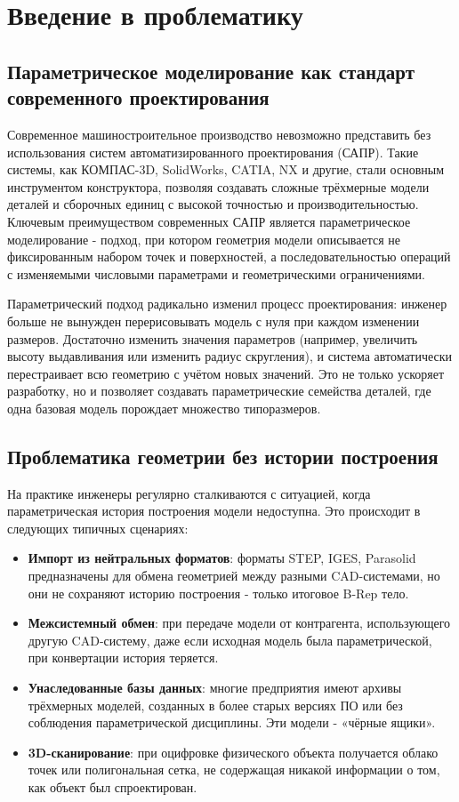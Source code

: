 
\section{Введение в проблематику}

\subsection{Параметрическое моделирование как стандарт современного проектирования}

Современное машиностроительное производство невозможно представить без использования систем автоматизированного проектирования (САПР). Такие системы, как КОМПАС-3D, SolidWorks, CATIA, NX и другие, стали основным инструментом конструктора, позволяя создавать сложные трёхмерные модели деталей и сборочных единиц с высокой точностью и производительностью. Ключевым преимуществом современных САПР является параметрическое моделирование - подход, при котором геометрия модели описывается не фиксированным набором точек и поверхностей, а последовательностью операций с изменяемыми числовыми параметрами и геометрическими ограничениями.

Параметрический подход радикально изменил процесс проектирования: инженер больше не вынужден перерисовывать модель с нуля при каждом изменении размеров. Достаточно изменить значения параметров (например, увеличить высоту выдавливания или изменить радиус скругления), и система автоматически перестраивает всю геометрию с учётом новых значений. Это не только ускоряет разработку, но и позволяет создавать параметрические семейства деталей, где одна базовая модель порождает множество типоразмеров.

\subsection{Проблематика геометрии без истории построения}

На практике инженеры регулярно сталкиваются с ситуацией, когда параметрическая история построения модели недоступна. Это происходит в следующих типичных сценариях:

\begin{itemize}
    \item \textbf{Импорт из нейтральных форматов}: форматы STEP, IGES, Parasolid предназначены для обмена геометрией между разными CAD-системами, но они не сохраняют историю построения - только итоговое B-Rep тело.
    \item \textbf{Межсистемный обмен}: при передаче модели от контрагента, использующего другую CAD-систему, даже если исходная модель была параметрической, при конвертации история теряется.
    \item \textbf{Унаследованные базы данных}: многие предприятия имеют архивы трёхмерных моделей, созданных в более старых версиях ПО или без соблюдения параметрической дисциплины. Эти модели - «чёрные ящики».
    \item \textbf{3D-сканирование}: при оцифровке физического объекта получается облако точек или полигональная сетка, не содержащая никакой информации о том, как объект был спроектирован.
\end{itemize}

